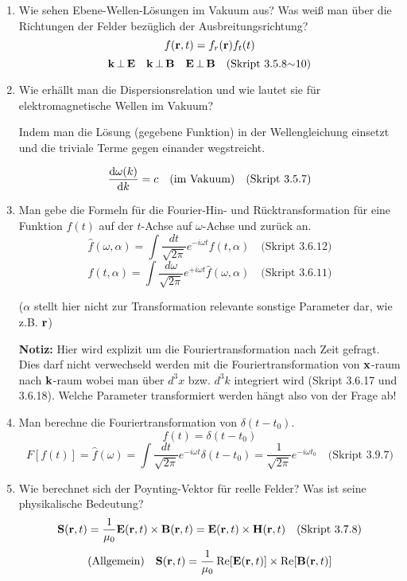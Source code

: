 \documentclass{scrartcl}
\newcommand{\sref}[1]{(Skript #1)}
\newcommand{\smref}[1]{\quad\text{(Skript #1)}}
\begin{document}
\begin{enumerate}
    \item Wie sehen Ebene-Wellen-Lösungen im Vakuum aus? Was weiß man
          über die Richtungen der Felder bezüglich der 
          Ausbreitungsrichtung?
          $$f(\vb r , t)=f_r(\vb r)f_t(t)$$
          $$\vb k \,\bot\, \vb E \quad \vb k\,\bot\,\vb B \quad
          \vb E\,\bot\, \vb B\smref{3.5.8$\sim$10}$$

    \item Wie erhällt man die Dispersionsrelation und wie lautet sie für
          elektromagnetische Wellen im Vakuum?
          \begin{center}
            Indem man die Lösung (gegebene Funktion) in 
            der Wellengleichung einsetzt und die
            triviale Terme gegen einander wegstreicht.
          \end{center}
          $$\dv{\omega(k)}{k}=c \quad\text{(im Vakuum)}\smref{3.5.7}$$

    \item Man gebe die Formeln für die Fourier-Hin- und Rücktransformation
          für eine Funktion $f(t)$ auf der $t$-Achse auf $\omega$-Achse und
          zurück an.
          $$\hat f(\omega, \alpha)=\int \frac{dt}{\sqrt{2\pi}}
                e^{-i\omega t}f(t, \alpha)\smref{3.6.12}$$
          $$f(t, \alpha)=\int \frac{d\omega}{\sqrt{2\pi}}
                           e^{+i\omega t}\hat f(\omega, \alpha)
                          \smref{3.6.11}$$
          \begin{center}
            ($\alpha$ stellt hier nicht zur Transformation relevante 
            sonstige Parameter dar, wie z.B. $\vb r$)
          \end{center}
          \textbf{Notiz:} Hier wird explizit um die Fouriertransformation 
          nach Zeit gefragt. Dies darf nicht verwechseld werden mit die 
          Fouriertransformation von $\vb x$-raum nach $\vb k$-raum 
          wobei man über
          $d^3x$ bzw. $d^3k$ integriert wird \sref{3.6.17 und 3.6.18}.
          Welche Parameter transformiert werden hängt also von der Frage 
          ab!

    \item Man berechne die Fouriertransformation von $\delta(t-t_0)$.
          $$f(t)=\delta (t-t_0)$$ 
          $$F[f(t)]=\hat f(\omega)
          =\int\frac{dt}{\sqrt{2\pi}}e^{-i\omega t}\delta(t-t_0)
          =\frac{1}{\sqrt{2\pi}}e^{-i\omega t_0}
          \smref{3.9.7}$$ 

    \item Wie berechnet sich der Poynting-Vektor für reelle Felder? Was
          ist seine physikalische Bedeutung?
          $$\vb S(\vb r,t)=\frac{1}{\mu_0}\vb E(\vb r,t)\times\vb B(\vb r,t)
          =\vb E(\vb r,t)\times \vb H(\vb r,t)
          \smref{3.7.8}$$
          $$\text{(Allgemein)}\quad\vb S(\vb r,t)=
          \frac{1}{\mu_0}\Re[\vb E(\vb r,t)]\times \Re[\vb B(\vb r,t)]$$
          

\end{enumerate}
\end{document}
